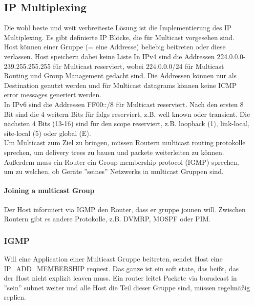 	\subsection{IP Multiplexing}
		Die wohl beste und weit verbreiteste Lösung ist die Implementierung des IP Multiplexing. Es gibt definierte IP Blöcke, die für Multicast vorgesehen sind. Host können einer Gruppe (= eine Addresse) beliebig beitreten oder diese verlassen. Host speichern dabei keine Liste 
		In IPv4 sind die Addressen 224.0.0.0-239.255.255.255 für Multicast reserviert, wobei 224.0.0.0/24 für Multicast Routing und Group Management gedacht sind. Die Addressen können nur als Destination genutzt werden und für Multicast datagrams können keine ICMP error messages generiert werden. \\
		In IPv6 sind die Addressen FF00::/8 für Multicast reserviert. Nach den ersten 8 Bit sind die 4 weitern Bits für falgs reserviert, z.B. well known oder transient. Die nächsten 4 Bits (13-16)  sind für den scope reserviert, z.B. loopback (1), link-local, site-local (5) oder global (E). \\
		Um Multicast zum Ziel zu bringen, müssen Routern multicast routing protokolle sprechen, um delivery trees zu bauen und packete weiterleiten zu können. Außerdem muss ein Router ein Group membership protocol (IGMP) sprechen, um zu welchen, ob Geräte ''seines'' Netzwerks in multicast Gruppen sind. 

		\paragraph{Joining a multicast Group}
			Der Host informiert via IGMP den Router, dass er gruppe jounen will. Zwischen Routern gibt es andere Protokolle, z.B. DVMRP, MOSPF oder PIM. 
		
		\subsubsection{IGMP}
			Will eine Application einer Multicast Gruppe beitreten, sendet Host eine IP\_ADD\_MEMBERSHIP request. Das ganze ist ein soft state, das heißt, das der Host nicht explizit leaven muss. Ein router leitet Packete via boradcast in ''sein'' subnet weiter und alle Host die Teil dieser Gruppe sind, müssen regelmäßig replien. 
 
